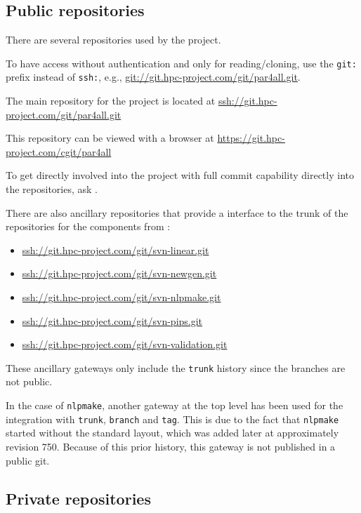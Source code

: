 \documentclass[a4paper]{article}
\begin{document}
\subsection{Public repositories}
\label{sec:public-repositories}

There are several \Agit repositories used by the project.

To have access without authentication and only for reading/cloning, use
the \texttt{git:} prefix instead of \texttt{ssh:}, e.g.,
\url{git://git.hpc-project.com/git/par4all.git}.

The main repository for the project is located at
\url{ssh://git.hpc-project.com/git/par4all.git}

This repository can be viewed with a \Awww browser at
\url{https://git.hpc-project.com/cgit/par4all}

To get directly involved into the project with full commit capability
directly into the repositories, ask \Ahpcp.

There are also ancillary \Agit repositories that provide a \Agit interface to
the trunk of the \Asvn repositories for the \Apips components from
\Acri:
\begin{itemize}
\item \url{ssh://git.hpc-project.com/git/svn-linear.git}
\item \url{ssh://git.hpc-project.com/git/svn-newgen.git}
\item \url{ssh://git.hpc-project.com/git/svn-nlpmake.git}
\item \url{ssh://git.hpc-project.com/git/svn-pips.git}
\item \url{ssh://git.hpc-project.com/git/svn-validation.git}
\end{itemize}
These ancillary gateways only include the \texttt{trunk} history since the
\Acri branches are not public.

In the case of \texttt{nlpmake}, another \Agit{} \Asvn gateway at the top
level has been used for the integration with \texttt{trunk},
\texttt{branch} and \texttt{tag}. This is due to the fact that
\texttt{nlpmake} started without the standard
layout, which was added later at approximately revision 750. Because
of this prior history, this gateway is not published in a public git.

\subsection{Private repositories}
\label{sec:private-repositories}
\end{document}
